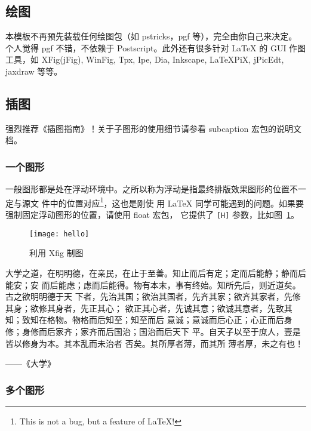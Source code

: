 \subsection{绘图}
\label{sec:draw}

本模板不再预先装载任何绘图包（如 \textsf{pstricks，pgf} 等），完全由你自己来决定。
个人觉得 \textsf{pgf} 不错，不依赖于 Postscript。此外还有很多针对 \LaTeX{} 的
 GUI 作图工具，如 XFig(jFig), WinFig, Tpx, Ipe, Dia, Inkscape, LaTeXPiX,
jPicEdt, jaxdraw 等等。

\subsection{插图}
\label{sec:graphs}

强烈推荐《\LaTeXe 插图指南》！关于子图形的使用细节请参看 \textsf{subcaption} 宏包的说明文档。

\subsubsection{一个图形}
\label{sec:onefig}
一般图形都是处在浮动环境中。之所以称为浮动是指最终排版效果图形的位置不一定与源文
件中的位置对应\footnote{This is not a bug, but a feature of \LaTeX!}，这也是刚使
用 \LaTeX{} 同学可能遇到的问题。如果要强制固定浮动图形的位置，请使用 \textsf{float} 宏包，
它提供了 \texttt{[H]} 参数，比如图~\ref{fig:xfig1}。
\begin{figure}[H] %
  \centering
  \texttt{[image: hello]}
  \caption{利用 Xfig 制图}
  \label{fig:xfig1}
\end{figure}

大学之道，在明明德，在亲民，在止于至善。知止而后有定；定而后能静；静而后能安；安
而后能虑；虑而后能得。物有本末，事有终始。知所先后，则近道矣。古之欲明明德于天
下者，先治其国；欲治其国者，先齐其家；欲齐其家者，先修其身；欲修其身者，先正其心；
欲正其心者，先诚其意；欲诚其意者，先致其知；致知在格物。物格而后知至；知至而后
意诚；意诚而后心正；心正而后身 修；身修而后家齐；家齐而后国治；国治而后天下
平。自天子以至于庶人，壹是皆以修身为本。其本乱而未治者 否矣。其所厚者薄，而其所
薄者厚，未之有也！

\hfill ——《大学》


\subsubsection{多个图形}
\label{sec:multifig}

